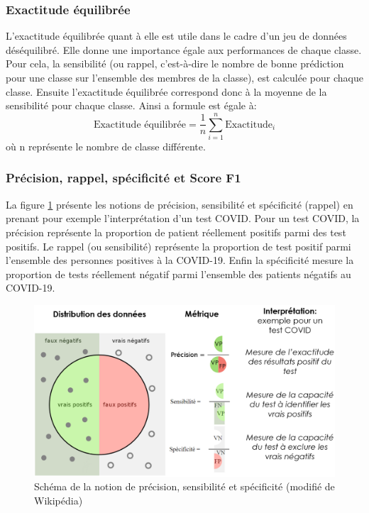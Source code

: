 \subsubsection{Exactitude équilibrée}
L'exactitude équilibrée quant à elle est utile dans le cadre d'un jeu de données déséquilibré. Elle donne une importance égale aux performances de chaque classe. Pour cela, la sensibilité (ou rappel, c'est-à-dire le nombre de bonne prédiction pour une classe sur l'ensemble des membres de la classe), est calculée pour chaque classe. Ensuite l'exactitude équilibrée correspond donc à la moyenne de la sensibilité pour chaque classe. Ainsi a formule est égale à:
\[ \text{Exactitude équilibrée} = \frac{1}{n} \sum_{i=1}^{n} \text{Exactitude}_i \] où n représente le nombre de classe différente.

\subsubsection{Précision, rappel, spécificité et Score F1}
La figure \ref{fig:prec_recall_spec} présente les notions de précision, sensibilité et spécificité (rappel) en prenant pour exemple l'interprétation d'un test COVID. Pour un test COVID, la précision représente la proportion de patient réellement positifs parmi des test positifs. Le rappel (ou sensibilité) représente la proportion de test positif parmi l'ensemble des personnes positives à la COVID-19. Enfin la spécificité mesure la proportion de tests réellement négatif parmi l'ensemble des patients négatifs au COVID-19.

\begin{figure}[!htbp]
 \centering
 \includegraphics[width=1\textwidth]{figures/prec_recall.png}
 \caption[Précision, sensibilité et spécificité]{Schéma de la notion de précision, sensibilité et spécificité (modifié de Wikipédia)}
 \label{fig:prec_recall_spec}
\end{figure}

